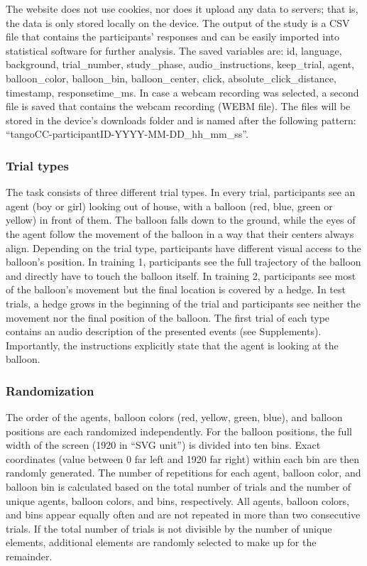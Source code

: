 \documentclass[
  man,mask,floatsintext]{apa7}
\begin{document}
The website does not use cookies, nor does it upload any data to servers; that is, the data is only stored locally on the device. The output of the study is a CSV file that contains the participants' responses and can be easily imported into statistical software for further analysis. The saved variables are: id, language, background, trial\_number, study\_phase, audio\_instructions, keep\_trial, agent, balloon\_color, balloon\_bin, balloon\_center, click, absolute\_click\_distance, timestamp, responsetime\_ms. In case a webcam recording was selected, a second file is saved that contains the webcam recording (WEBM file). The files will be stored in the device's downloads folder and is named after the following pattern: ``tangoCC-participantID-YYYY-MM-DD\_hh\_mm\_ss''.

\hypertarget{trial-types}{%
\subsubsection{Trial types}\label{trial-types}}

The task consists of three different trial types. In every trial, participants see an agent (boy or girl) looking out of house, with a balloon (red, blue, green or yellow) in front of them. The balloon falls down to the ground, while the eyes of the agent follow the movement of the balloon in a way that their centers always align. Depending on the trial type, participants have different visual access to the balloon's position.
In training 1, participants see the full trajectory of the balloon and directly have to touch the balloon itself. In training 2, participants see most of the balloon's movement but the final location is covered by a hedge. In test trials, a hedge grows in the beginning of the trial and participants see neither the movement nor the final position of the balloon. The first trial of each type contains an audio description of the presented events (see Supplements). Importantly, the instructions explicitly state that the agent is looking at the balloon.

\hypertarget{randomization}{%
\subsubsection{Randomization}\label{randomization}}

The order of the agents, balloon colors (red, yellow, green, blue), and balloon positions are each randomized independently. For the balloon positions, the full width of the screen (1920 in ``SVG unit'') is divided into ten bins. Exact coordinates (value between 0 far left and 1920 far right) within each bin are then randomly generated. The number of repetitions for each agent, balloon color, and balloon bin is calculated based on the total number of trials and the number of unique agents, balloon colors, and bins, respectively. All agents, balloon colors, and bins appear equally often and are not repeated in more than two consecutive trials. If the total number of trials is not divisible by the number of unique elements, additional elements are randomly selected to make up for the remainder.
\end{document}
